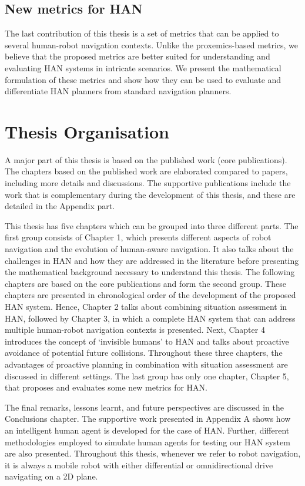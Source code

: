 \subsection*{New metrics for HAN}
The last contribution of this thesis is a set of metrics that can be applied to several human-robot navigation contexts. Unlike the proxemics-based metrics, we believe that the proposed metrics are better suited for understanding and evaluating HAN systems in intricate scenarios. We present the mathematical formulation of these metrics and show how they can be used to evaluate and differentiate HAN planners from standard navigation planners.

\section*{Thesis Organisation}
A major part of this thesis is based on the published work (core publications). The chapters based on the published work are elaborated compared to papers, including more details and discussions. The supportive publications include the work that is complementary during the development of this thesis, and these are detailed in the Appendix part.

This thesis has five chapters which can be grouped into three different parts. The first group consists of Chapter 1, which presents different aspects of robot navigation and the evolution of human-aware navigation. It also talks about the challenges in HAN and how they are addressed in the literature before presenting the mathematical background necessary to understand this thesis. The following chapters are based on the core publications and form the second group. These chapters are presented in chronological order of the development of the proposed HAN system. Hence, Chapter 2 talks about combining situation assessment in HAN, followed by Chapter 3, in which a complete HAN system that can address multiple human-robot navigation contexts is presented. Next, Chapter 4 introduces the concept of `invisible humans' to HAN and talks about proactive avoidance of potential future collisions. Throughout these three chapters, the advantages of proactive planning in combination with situation assessment are discussed in different settings. The last group has only one chapter, Chapter 5, that proposes and evaluates some new metrics for HAN.

The final remarks, lessons learnt, and future perspectives are discussed in the Conclusions chapter.  The supportive work presented in Appendix A shows how an intelligent human agent is developed for the case of HAN. Further, different methodologies employed to simulate human agents for testing our HAN system are also presented. Throughout this thesis, whenever we refer to robot navigation, it is always a mobile robot with either differential or omnidirectional drive navigating on a 2D plane.

